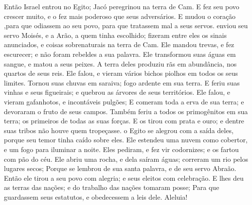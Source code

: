 {Então Israel entrou no Egito; Jacó peregrinou na terra de Cam.
E fez seu povo crescer muito, e o fez mais poderoso que seus adversários.
E mudou o coração
{} ,para que odiassem ao seu povo, para que tratassem mal a seus servos.
 enviou seu servo Moisés, e a Arão, a quem tinha escolhido;
 fizeram entre eles os sinais anunciados, e coisas sobrenaturais na terra de Cam.
Ele mandou trevas, e fez escurecer; e não foram rebeldes a sua palavra.
Ele transformou suas águas em sangue, e matou a seus peixes.
A terra deles produziu rãs em abundância,
{} nos quartos de seus reis.
Ele falou, e vieram vários bichos
{} piolhos em todos os seus limites.
Tornou suas chuvas em saraiva;
{} fogo ardente em sua terra.
E feriu suas vinhas e seus figueirais; e quebrou as árvores de seus territórios.
Ele falou, e vieram gafanhotos, e incontáveis pulgões;
E comeram toda a erva de sua terra; e devoraram o fruto de seus campos.
Também feriu a todos os primogênitos em sua terra; os primeiros de todas as suas forças.
E os tirou
{} com prata e ouro; e dentre suas tribos não houve quem tropeçasse.
 o Egito se alegrou com a saída deles, porque seu temor tinha caído sobre eles.
Ele estendeu uma nuvem como cobertor, e um fogo para iluminar a noite.
Eles pediram, e fez vir codornizes; e os fartou com pão do céu.
Ele abriu uma rocha, e dela saíram águas;
{} correram
{} um rio pelos lugares secos;
Porque se lembrou de sua santa palavra, e de seu servo Abraão.
Então ele tirou
{} a seu povo com alegria; e seus eleitos com celebração.
E lhes deu as terras das nações; e do trabalho das nações tomaram posse;
Para que guardassem seus estatutos, e obedecessem a leis dele. Aleluia!

}
